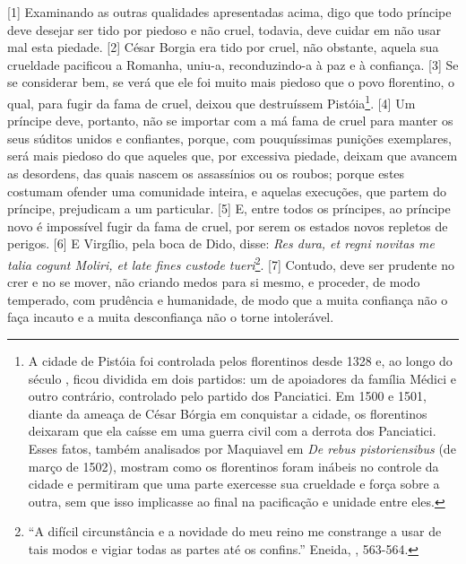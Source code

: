 {[}1{]} Examinando as outras qualidades apresentadas acima, digo que
todo príncipe deve desejar ser tido por piedoso e não cruel, todavia,
deve cuidar em não usar mal esta piedade. {[}2{]} César Borgia era tido
por cruel, não obstante, aquela sua crueldade pacificou a Romanha,
uniu-a, reconduzindo-a à paz e à confiança. {[}3{]} Se se considerar
bem, se verá que ele foi muito mais piedoso que o povo florentino, o
qual, para fugir da fama de cruel, deixou que destruíssem
Pistóia\footnote{A cidade de Pistóia foi controlada pelos florentinos
  desde 1328 e, ao longo do século , ficou dividida em dois partidos:
  um de apoiadores da família Médici e outro contrário, controlado pelo
  partido dos Panciatici. Em 1500 e 1501, diante da ameaça de César
  Bórgia em conquistar a cidade, os florentinos deixaram que ela caísse
  em uma guerra civil com a derrota dos Panciatici. Esses fatos, também
  analisados por Maquiavel em \emph{De rebus pistoriensibus} (de março
  de 1502), mostram como os florentinos foram inábeis no controle da
  cidade e permitiram que uma parte exercesse sua crueldade e força
  sobre a outra, sem que isso implicasse ao final na pacificação e
  unidade entre eles.}. {[}4{]} Um príncipe deve, portanto, não se
importar com a má fama de cruel para manter os seus súditos unidos e
confiantes, porque, com pouquíssimas punições exemplares, será mais
piedoso do que aqueles que, por excessiva piedade, deixam que avancem as
desordens, das quais nascem os assassínios ou os roubos; porque estes
costumam ofender uma comunidade inteira, e aquelas execuções, que partem
do príncipe, prejudicam a um particular. {[}5{]} E, entre todos os
príncipes, ao príncipe novo é impossível fugir da fama de cruel, por
serem os estados novos repletos de perigos. {[}6{]} E Virgílio, pela
boca de Dido, disse: \emph{Res dura, et regni novitas me talia cogunt
Moliri, et late fines custode tueri}\footnote{``A difícil circunstância
  e a novidade do meu reino me constrange a usar de tais modos e vigiar
  todas as partes até os confins.'' Eneida, , 563-564.}. {[}7{]}
Contudo, deve ser prudente no crer e no se mover, não criando medos para
si mesmo, e proceder, de modo temperado, com prudência e humanidade, de
modo que a muita confiança não o faça incauto e a muita desconfiança não
o torne intolerável.

